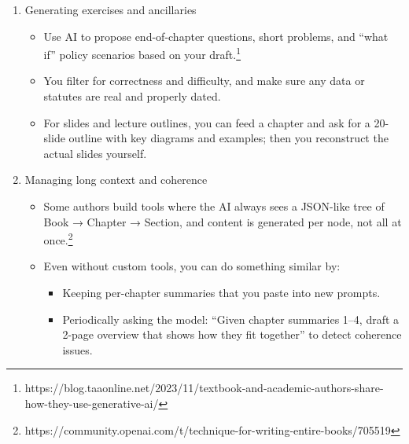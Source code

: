\documentclass[
  11pt,
]{article}
\providecommand{\tightlist}{%
  \setlength{\itemsep}{0pt}\setlength{\parskip}{0pt}}
\begin{document}
\begin{enumerate}
\begin{itemize}
    \begin{itemize}
    \tightlist
    \item
      Check every legal, regulatory, and empirical claim against primary sources.
    \item
      Rewrite where nuance or originality is crucial (e.g., your own empirical findings or doctrinal argument).
    \end{itemize}
  \end{itemize}
\item
  Generating exercises and ancillaries

  \begin{itemize}
  \tightlist
  \item
    Use AI to propose end-of-chapter questions, short problems, and ``what if'' policy scenarios based on your draft.\footnote{https://blog.taaonline.net/2023/11/textbook-and-academic-authors-share-how-they-use-generative-ai/}
  \item
    You filter for correctness and difficulty, and make sure any data or statutes are real and properly dated.
  \item
    For slides and lecture outlines, you can feed a chapter and ask for a 20-slide outline with key diagrams and examples; then you reconstruct the actual slides yourself.
  \end{itemize}
\item
  Managing long context and coherence

  \begin{itemize}
  \tightlist
  \item
    Some authors build tools where the AI always sees a JSON-like tree of Book → Chapter → Section, and content is generated per node, not all at once.\footnote{https://community.openai.com/t/technique-for-writing-entire-books/705519}
  \item
    Even without custom tools, you can do something similar by:

    \begin{itemize}
    \tightlist
    \item
      Keeping per-chapter summaries that you paste into new prompts.
    \item
      Periodically asking the model: ``Given chapter summaries 1--4, draft a 2-page overview that shows how they fit together'' to detect coherence issues.
    \end{itemize}
  \end{itemize}
\end{enumerate}
\end{document}
